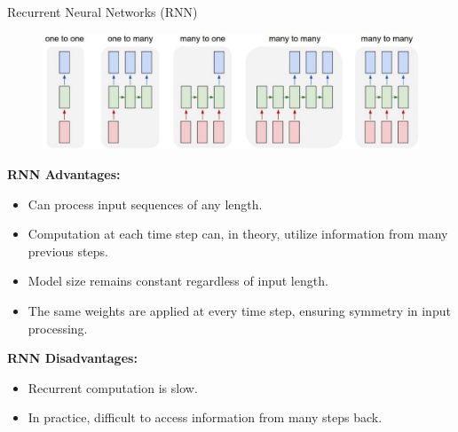 \begin{frame}[allowframebreaks]{Recurrent Neural Networks (RNN)}
    \framebreak

    \begin{figure}
        \centering
        \includegraphics[width=1.05\textwidth,keepaspectratio]{images/rnn/slide_5_1_img.jpg}
    \end{figure}

    \framebreak

    \textbf{RNN Advantages:}
    \begin{itemize}
        \item Can process input sequences of any length.
        \item Computation at each time step can, in theory, utilize information from many previous steps.
        \item Model size remains constant regardless of input length.
        \item The same weights are applied at every time step, ensuring symmetry in input processing.
    \end{itemize}

    \vspace{1em}

    \textbf{RNN Disadvantages:}
    \begin{itemize}
        \item Recurrent computation is slow.
        \item In practice, difficult to access information from many steps back.
    \end{itemize}

\end{frame}
